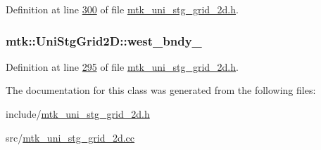 Definition at line \hyperlink{mtk__uni__stg__grid__2d_8h_source_l00300}{300} of file \hyperlink{mtk__uni__stg__grid__2d_8h_source}{mtk\+\_\+uni\+\_\+stg\+\_\+grid\+\_\+2d.\+h}.

\hypertarget{classmtk_1_1UniStgGrid2D_a59c42d8099a017bc8a082fddc1e5606c}{
\subsubsection[{west\+\_\+bndy\+\_\+}]{ mtk\+::\+Uni\+Stg\+Grid2\+D\+::west\+\_\+bndy\+\_\+\hspace{0.3cm}{\ttfamily [private]}}}\label{classmtk_1_1UniStgGrid2D_a59c42d8099a017bc8a082fddc1e5606c}


Definition at line \hyperlink{mtk__uni__stg__grid__2d_8h_source_l00295}{295} of file \hyperlink{mtk__uni__stg__grid__2d_8h_source}{mtk\+\_\+uni\+\_\+stg\+\_\+grid\+\_\+2d.\+h}.



The documentation for this class was generated from the following files\+:\begin{DoxyCompactItemize}
\item 
include/\hyperlink{mtk__uni__stg__grid__2d_8h}{mtk\+\_\+uni\+\_\+stg\+\_\+grid\+\_\+2d.\+h}\item 
src/\hyperlink{mtk__uni__stg__grid__2d_8cc}{mtk\+\_\+uni\+\_\+stg\+\_\+grid\+\_\+2d.\+cc}\end{DoxyCompactItemize}
